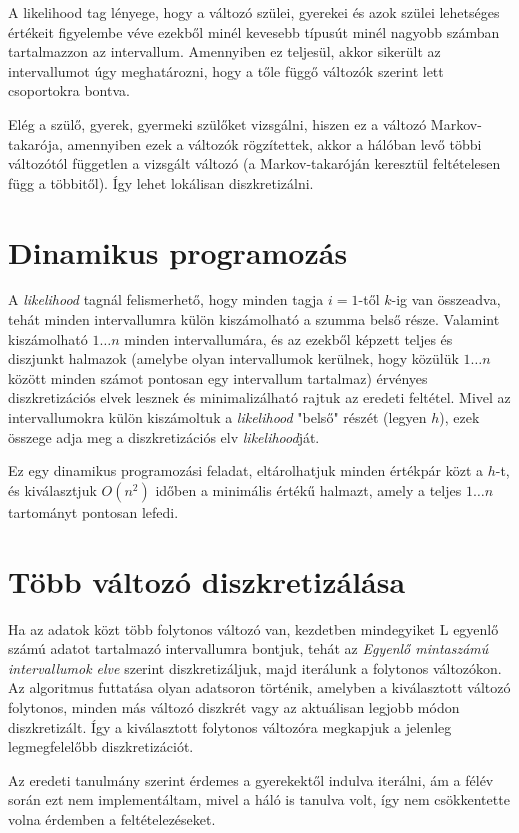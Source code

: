 A likelihood tag lényege, hogy a változó szülei, gyerekei és azok szülei lehetséges értékeit figyelembe véve ezekből minél kevesebb típusút minél nagyobb számban tartalmazzon az intervallum. Amennyiben ez teljesül, akkor sikerült az intervallumot úgy meghatározni, hogy a tőle függő változók szerint lett csoportokra bontva.

Elég a szülő, gyerek, gyermeki szülőket vizsgálni, hiszen ez a változó Markov-takarója, amennyiben ezek a változók rögzítettek, akkor a hálóban levő többi változótól független a vizsgált változó (a Markov-takaróján keresztül feltételesen függ a többitől). Így lehet lokálisan diszkretizálni.

\section{Dinamikus programozás}
A \textit{likelihood} tagnál felismerhető, hogy minden tagja $i=1$-től $k$-ig van összeadva, tehát minden intervallumra külön kiszámolható a szumma belső része. Valamint kiszámolható $1 \dotsc n$ minden intervallumára, és az ezekből képzett teljes és diszjunkt halmazok (amelybe olyan intervallumok kerülnek, hogy közülük $1 \dotsc n$ között minden számot pontosan egy intervallum tartalmaz) érvényes diszkretizációs elvek lesznek és minimalizálható rajtuk az eredeti feltétel. Mivel az intervallumokra külön kiszámoltuk a \textit{likelihood} "belső" részét (legyen $h$), ezek összege adja meg a diszkretizációs elv \textit{likelihood}ját.

Ez egy dinamikus programozási feladat, eltárolhatjuk minden értékpár közt a $h$-t, és kiválasztjuk $O(n^2)$ időben a minimális értékű halmazt, amely a teljes $1 \dotsc n$ tartományt pontosan lefedi.

\section{Több változó diszkretizálása}
Ha az adatok közt több folytonos változó van, kezdetben mindegyiket L egyenlő számú adatot tartalmazó intervallumra bontjuk, tehát az \textit{Egyenlő mintaszámú intervallumok elve} szerint diszkretizáljuk,  majd iterálunk a folytonos változókon. Az algoritmus futtatása olyan adatsoron történik, amelyben a kiválasztott változó folytonos, minden más változó diszkrét vagy az aktuálisan legjobb módon diszkretizált. Így a kiválasztott folytonos változóra megkapjuk a jelenleg legmegfelelőbb diszkretizációt.

Az eredeti tanulmány szerint érdemes a gyerekektől indulva iterálni, ám a félév során ezt nem implementáltam, mivel a háló is tanulva volt, így nem csökkentette volna érdemben a feltételezéseket.

